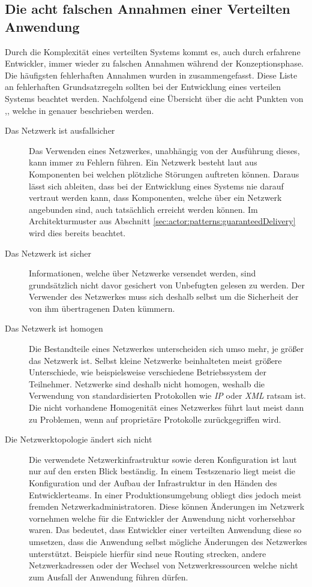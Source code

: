 \subsection{Die acht falschen Annahmen einer Verteilten Anwendung}\label{sec:distributedSystems:wrongAssumptions} 
Durch die Komplexität eines verteilten Systems kommt es, auch durch erfahrene Entwickler, immer wieder zu falschen Annahmen während der Konzeptionsphase. Die häufigsten fehlerhaften Annahmen wurden in \cite{deutsch1994eight} zusammengefasst. Diese Liste an fehlerhaften Grundsatzregeln sollten bei der Entwicklung eines verteilen Systems beachtet werden. Nachfolgend eine Übersicht über die acht Punkten von \cite{deutsch1994eight},, welche in \cite{rotem2006fallacies} genauer beschrieben werden.
\begin{description}
    \item[Das Netzwerk ist ausfallsicher]
    Das Verwenden eines Netzwerkes, unabhängig von der Ausführung dieses, kann immer zu Fehlern führen. Ein Netzwerk besteht laut \cite{rotem2006fallacies} aus Komponenten bei welchen plötzliche Störungen auftreten können. Daraus lässt sich ableiten, dass bei der Entwicklung eines Systems nie darauf vertraut werden kann, dass Komponenten, welche über ein Netzwerk angebunden sind, auch tatsächlich erreicht werden können. Im Architekturmuster aus Abschnitt \ref{sec:actor:patterns:guaranteedDelivery} wird dies bereits beachtet.
    \item[Das Netzwerk ist sicher]
    Informationen, welche über Netzwerke versendet werden, sind grundsätzlich nicht davor gesichert von Unbefugten gelesen zu werden. Der Verwender des Netzwerkes muss sich deshalb selbst um die Sicherheit der von ihm übertragenen Daten kümmern.
    \item[Das Netzwerk ist homogen]
    Die Bestandteile eines Netzwerkes unterscheiden sich umso mehr, je größer das Netzwerk ist. Selbst kleine Netzwerke beinhalteten meist größere Unterschiede, wie beispielsweise verschiedene Betriebssystem der Teilnehmer. Netzwerke sind deshalb nicht homogen, weshalb die Verwendung von standardisierten Protokollen wie  \textit{IP} oder \textit{XML} ratsam ist. Die nicht vorhandene Homogenität eines Netzwerkes führt laut \cite{rotem2006fallacies} meist dann zu Problemen, wenn auf proprietäre Protokolle zurückgegriffen wird.
    \item[Die Netzwerktopologie ändert sich nicht]
    Die verwendete Netzwerkinfrastruktur sowie deren Konfiguration ist laut \cite{rotem2006fallacies} nur auf den ersten Blick beständig. In einem Testszenario liegt meist die Konfiguration und der Aufbau der Infrastruktur in den Händen des Entwicklerteams. In einer Produktionsumgebung obliegt dies jedoch meist fremden Netzwerkadministratoren. Diese können Änderungen im Netzwerk vornehmen welche für die Entwickler der Anwendung nicht vorhersehbar waren. Das bedeutet, dass Entwickler einer verteilten Anwendung diese so umsetzen, dass die Anwendung selbst mögliche Änderungen des Netzwerkes unterstützt.  Beispiele hierfür sind neue Routing strecken, andere Netzwerkadressen oder der Wechsel von Netzwerkressourcen welche nicht zum Ausfall der Anwendung führen dürfen. 

\end{description}

